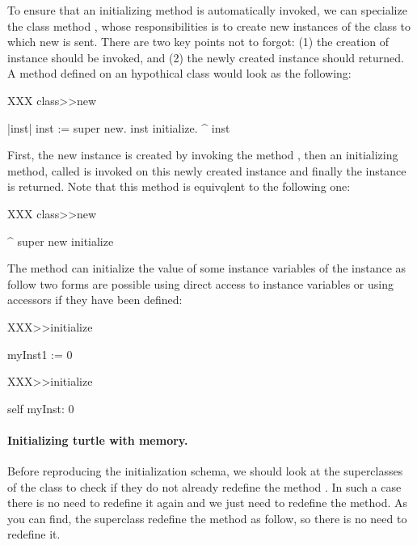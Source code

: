 To ensure that an initializing method is automatically invoked, we can
specialize the class method , whose responsibilities is to
create new instances of the class to which new is sent. There are two
key points not to forgot: (1) the creation of instance should be
invoked, and (2) the newly created instance should returned.  A method
 defined on an hypothical class  would look as the following:

\begin{method}
XXX class>>new
 
    |inst|
    inst := super new.
    inst initialize.
    ^ inst
\end{method}

First, the new instance is created by invoking the method ,
then an initializing method, called  is invoked on this
newly created instance and finally the instance is returned. Note that this 
method is equivqlent to the following one: 

\begin{method}
XXX class>>new

	^ super new initialize
\end{method}

The method  can initialize the value of some instance
variables of the instance as follow two forms are possible using
direct access to instance variables or using accessors if they have
been defined:

\begin{method}
XXX>>initialize
 
    myInst1 := 0
\end{method}

\begin{method}
XXX>>initialize
 
    self myInst: 0
\end{method}



\paragraph{Initializing turtle with memory.}
Before reproducing the initialization schema, we should look at the
superclasses of the class  to check if they do
not already redefine the method .  In such a case there is no
need to redefine it again and we just need to redefine the
 method. As you can find, the superclass 
redefine the method  as follow, so there is no need to
redefine it.


